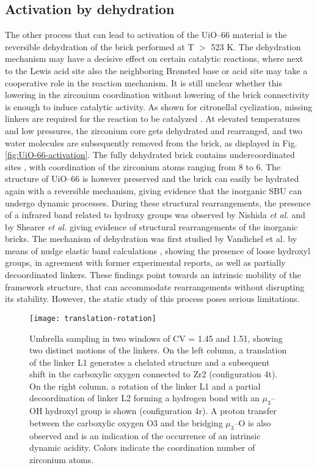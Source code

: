 \subsection*{Activation by dehydration}
The other process that can lead to activation of the UiO--66 material is the reversible dehydration of the brick performed at T $>$ 523 K. The dehydration mechanism may have a decisive effect on certain catalytic reactions, where next to the Lewis acid site also the neighboring Br\o{}nsted base or acid site may take a cooperative role in the reaction mechanism. It is still unclear whether this lowering in the zirconium coordination without lowering of the brick connectivity is enough to induce catalytic activity. As shown for citronellal cyclization, missing linkers are required for the reaction to be catalyzed \cite{vermoortele2012electronic}. 
\npar
At elevated temperatures and low pressures, the zirconium core gets dehydrated and rearranged, and two water molecules are subsequently removed from the brick, as displayed in Fig. \ref{fig:UiO-66-activation}. The fully dehydrated  brick contains undercoordinated sites \cite{valenzano2011disclosing, decoste2013stability, shearer2013situ, vandichel2015active}, with coordination of the zirconium atoms ranging from 8 to 6. The structure of UiO--66 is however preserved and the brick can easily be hydrated again with a reversible mechanism, giving evidence that the inorganic SBU can undergo dynamic processes. During these structural rearrangements, the presence of a infrared band related to hydroxy groups was observed by Nishida \textit{et al.} \cite{nishida2014structural} and by Shearer \textit{et al.} \cite{shearer2013situ} giving evidence of structural rearrangements of the inorganic bricks. The mechanism of dehydration was first studied by Vandichel et al. by means of nudge elastic band calculations \cite{vandichel2016water}, showing the presence of loose hydroxyl groups, in agreement with former experimental reports, as well as partially decoordinated linkers. These findings point towards an intrinsic mobility of the framework structure, that can accommodate rearrangements without disrupting its stability. However, the static study of this process poses serious limitations. 
\begin{figure}[!htbp]
	\centering
	\texttt{[image: translation-rotation]}
	\caption{Umbrella sampling in two windows of CV = 1.45 and 1.51, showing two distinct motions of the linkers. On the left column, a translation of the linker L1 generates a chelated structure and a subsequent shift in the carboxylic oxygen connected to Zr2 (configuration 4t). On the right column, a rotation of the linker L1 and a partial decoordination of linker L2 forming a hydrogen bond with an $\mu_3$--OH hydroxyl group is shown (configuration 4r). A proton transfer between the carboxylic oxygen O3 and the bridging $\mu_3$--O is also observed and is an indication of the occurrence of an intrinsic dynamic acidity. Colors indicate the coordination number of zirconium atoms.}
	\label{fig:translation-rotation}
\end{figure}

